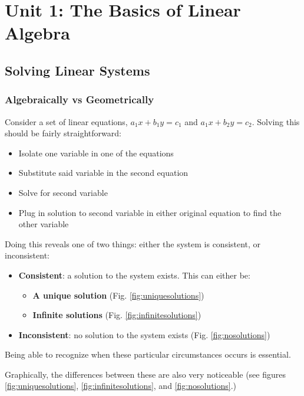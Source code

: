 \documentclass[12pt]{article}
\begin{document}
\pagestyle{justthefooter}
{
  \hypersetup{linkcolor=violet}
  \tableofcontents
}

\newpage
\pagestyle{headerandfooter}
\section[Unit 1]{Unit 1: The Basics of Linear Algebra}
\subsection{Solving Linear Systems}
\subsubsection{Algebraically vs Geometrically}
Consider a set of linear equations, $a_1 x+b_1 y = c_1$ and $a_1 x+b_2 y = c_2$. Solving this should be fairly straightforward:
\begin{itemize}
    \item Isolate one variable in one of the equations
    \item Substitute said variable in the second equation
    \item Solve for second variable
    \item Plug in solution to second variable in either original equation to find the other variable
\end{itemize}

Doing this reveals one of two things: either the system is consistent, or inconsistent:

\begin{itemize}\label{list:solntypes}
    \item \textbf{Consistent}: a solution to the system exists. This can either be:
    \begin{itemize}
        \item \textbf{A unique solution} (Fig. \ref{fig:uniquesolutions})
        \item \textbf{Infinite solutions} (Fig. \ref{fig:infinitesolutions})
    \end{itemize}
    \item \textbf{Inconsistent}: no solution to the system exists (Fig. \ref{fig:nosolutions})
\end{itemize}

Being able to recognize when these particular circumstances occurs is essential.

Graphically, the differences between these are also very noticeable (see figures  \ref{fig:uniquesolutions}, \ref{fig:infinitesolutions}, and \ref{fig:nosolutions}.)
\end{document}
